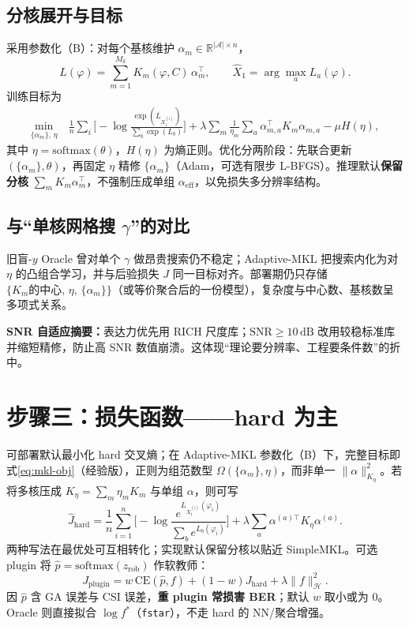 \subsection{分核展开与目标}
采用参数化（B）：对每个基核维护 $\alpha_m\in\mathbb{R}^{|\mathcal{A}|\times n}$，
\begin{equation}
L(\varphi)=\sum_{m=1}^{M_k} K_m(\varphi,C)\,\alpha_m^\top,
\qquad
\hat X_1=\arg\max_a L_a(\varphi).
\label{eq:method-Lm}
\end{equation}
训练目标为
\begin{equation}
\begin{aligned}
\min_{\{\alpha_m\},\,\eta}
&\ 
\frac1n\sum_i\Big[
-\log\frac{\exp(L_{X_1^{(i)}})}{\sum_b\exp(L_b)}
\Big]
+\lambda\sum_m\frac{1}{\eta_m}\sum_a\alpha_{m,a}^\top K_m\alpha_{m,a}
-\mu H(\eta),
\end{aligned}
\label{eq:mkl-obj}
\end{equation}
其中 $\eta=\mathrm{softmax}(\theta)$，$H(\eta)$ 为熵正则。优化分两阶段：先联合更新 $(\{\alpha_m\},\theta)$，再固定 $\eta$ 精修 $\{\alpha_m\}$（Adam，可选有限步 L-BFGS）。推理默认\textbf{保留分核} $\sum_m K_m\alpha_m^\top$，不强制压成单组 $\alpha_{\mathrm{eff}}$，以免损失多分辨率结构。

\subsection{与“单核网格搜 $\gamma$”的对比}
旧盲-$y$ Oracle 曾对单个 $\gamma$ 做昂贵搜索仍不稳定；Adaptive-MKL 把搜索内化为对 $\eta$ 的凸组合学习，并与后验损失 $J$ 同一目标对齐。部署期仍只存储 $\{K_m\text{的中心},\,\eta,\,\{\alpha_m\}\}$（或等价聚合后的一份模型），复杂度与中心数、基核数呈多项式关系。

\textbf{SNR 自适应摘要：}表达力优先用 RICH 尺度库；$\mathrm{SNR}\ge 10\,\mathrm{dB}$ 改用较稳标准库并缩短精修，防止高 SNR 数值崩溃。这体现“理论要分辨率、工程要条件数”的折中。

\section{步骤三：损失函数——hard 为主}

可部署默认最小化 hard 交叉熵；在 Adaptive-MKL 参数化（B）下，完整目标即式\eqref{eq:mkl-obj}（经验版），正则为组范数型 $\Omega(\{\alpha_m\},\eta)$，而非单一 $\|\alpha\|_{K_\eta}^2$。若将多核压成 $K_\eta=\sum_m\eta_m K_m$ 与单组 $\alpha$，则可写
\begin{equation}
\widehat J_{\mathrm{hard}}
=\frac1n\sum_{i=1}^n\Big[
-\log\frac{e^{L_{X_1^{(i)}}(\varphi_i)}}{\sum_b e^{L_b(\varphi_i)}}
\Big]
+\lambda\sum_a\alpha^{(a)\top}K_\eta\alpha^{(a)}.
\end{equation}
两种写法在最优处可互相转化；实现默认保留分核以贴近 SimpleMKL。可选 plugin 将 $\hat p=\mathrm{softmax}(z_{\mathrm{rob}})$ 作软教师：
\begin{equation}
J_{\mathrm{plugin}}=w\,\mathrm{CE}(\hat p,f)+(1-w)J_{\mathrm{hard}}+\lambda\|f\|_{\mathcal{H}}^2.
\end{equation}
因 $\hat p$ 含 GA 误差与 CSI 误差，\textbf{重 plugin 常损害 BER}；默认 $w$ 取小或为 0。Oracle 则直接拟合 $\log f^*$（\texttt{fstar}），不走 hard 的 NN/聚合增强。

